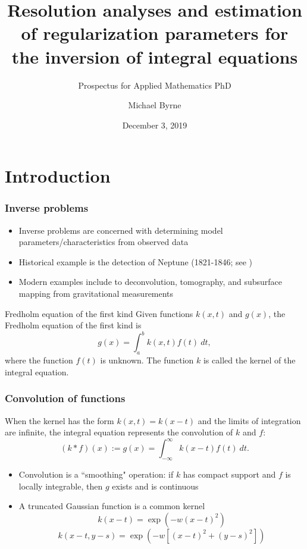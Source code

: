 \documentclass[t]{beamer}
\author{Michael Byrne}
\title[Regularization Parameter Estimation]{Resolution analyses and estimation of regularization parameters for the inversion of integral equations}
\subtitle{Prospectus for Applied Mathematics PhD}
\institute{Arizona State University}
\date{December 3, 2019}
\begin{document}
\begin{frame}
\titlepage
\end{frame}

\begin{frame}
\tableofcontents
\end{frame}

\section{Introduction}

\begin{frame}
\frametitle{Inverse problems}
\begin{itemize}
\item Inverse problems are concerned with determining model parameters/characteristics from observed data
\item Historical example is the detection of Neptune (1821-1846; see \cite{Airy1847})
\item Modern examples include to deconvolution, tomography, and subsurface mapping from gravitational measurements \cite{ABT}
\end{itemize}
\begin{block}{Fredholm equation of the first kind}
Given functions $k(x,t)$ and $g(x)$, the Fredholm equation of the first kind is
\[g(x) = \int_a^b k(x,t)f(t)~dt,\]
where the function $f(t)$ is unknown. The function $k$ is called the kernel of the integral equation.
\end{block}
\end{frame}

\begin{frame}
\frametitle{Convolution of functions}
When the kernel has the form $k(x,t) = k(x-t)$ and the limits of integration are infinite, the integral equation represents the convolution of $k$ and $f$:
\[(k * f)(x) := g(x) = \int_{-\infty}^{\infty} k(x-t)f(t)~dt.\]
\begin{itemize}
\item Convolution is a ``smoothing" operation: if $k$ has compact support and $f$ is locally integrable, then $g$ exists and is continuous \cite{DebnathMikusinski2005} 
\item A truncated Gaussian function is a common kernel
\[k(x-t) = \exp\left(-w(x-t)^2\right)\]
\[k(x-t,y-s) = \exp\left(-w\left[(x-t)^2+(y-s)^2\right]\right)\]
\end{itemize}
\end{frame}
\end{document}
